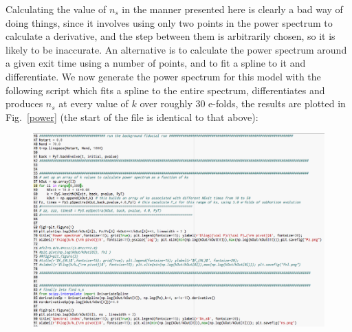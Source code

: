 \documentclass[10pt,
amsmath,amssymb,
aps,prd,nofootinbib,eqsecnum,a4paper]{revtex4}
\begin{document}
Calculating the value of $n_s$ in the manner presented 
here is clearly a bad way of doing things, since it involves using only two points 
in the power spectrum to calculate a derivative, and the step between them is arbitrarily chosen, 
so it is likely to be inaccurate. 
An alternative is to calculate the power spectrum 
around a given exit time using a number of points, and to fit a spline to it and differentiate. We now generate the 
power spectrum for this model with the 
following script which fits a spline to the entire spectrum, differentiates and produces $n_s$ at every value of 
$k$ over roughly 30 e-folds, the results are plotted in Fig.~\ref{power} (the start of the file is identical to that above):
\begin{figure}[H]
\centering
\includegraphics[width=18cm]{shot6b}
\end{figure}
\end{document}
